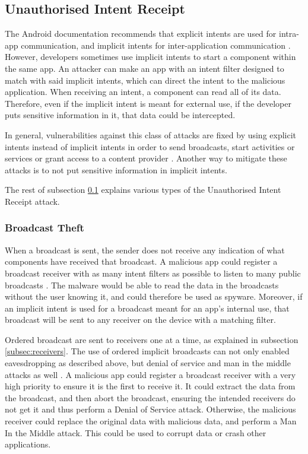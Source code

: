     \subsection{Unauthorised Intent Receipt}
        \label{subsec:unauthorised_intent_receipt}
        
    The Android documentation recommends that explicit intents are used for intra-app communication, and implicit intents for inter-application communication \cite{intents_and_intent_filters}. However, developers sometimes use implicit intents to start a component within the same app. An attacker can make an app with an intent filter designed to match with said implicit intents, which can direct the intent to the malicious application. When receiving an intent, a component can read all of its data. Therefore, even if the implicit intent is meant for external use, if the developer puts sensitive information in it, that data could be intercepted.
    
    In general, vulnerabilities against this class of attacks are fixed by using explicit intents instead of implicit intents in order to send broadcasts, start activities or services or grant access to a content provider \cite{2010_icc_paper}. Another way to mitigate these attacks is to not put sensitive information in implicit intents.
    
    The rest of subsection \ref{subsec:unauthorised_intent_receipt} explains various types of the Unauthorised Intent Receipt attack.
    
    \subsubsection{Broadcast Theft}
        \label{subsubsec:broadcast_theft}
    
    When a broadcast is sent, the sender does not receive any indication of what components have received that broadcast. A malicious app could register a broadcast receiver with as many intent filters as possible to listen to many public broadcasts \cite{2010_icc_paper}. The malware would be able to read the data in the broadcasts without the user knowing it, and could therefore be used as spyware. Moreover, if an implicit intent is used for a broadcast meant for an app’s internal use, that broadcast will be sent to any receiver on the device with a matching filter.
    
    Ordered broadcast are sent to receivers one at a time, as explained in subsection \ref{subsec:receivers}. The use of ordered implicit broadcasts can not only enabled eavesdropping as described above, but denial of service and man in the middle attacks as well \cite{2010_icc_paper}. A malicious app could register a broadcast receiver with a very high priority to ensure it is the first to receive it. It could extract the data from the broadcast, and then abort the broadcast, ensuring the intended receivers do not get it and thus perform a Denial of Service attack. Otherwise, the malicious receiver could replace the original data with malicious data, and perform a Man In the Middle attack. This could be used to corrupt data or crash other applications.
    
